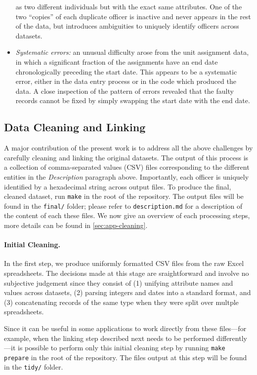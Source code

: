\begin{itemize}
		as two different individuals but with the exact same attributes. One of
		the two “copies” of each duplicate officer is inactive and never
		appears in the rest of the data, but introduces ambiguities to uniquely
		identify officers across datasets.
	\item \emph{Systematic errors:} an unusual difficulty arose from the unit
		assignment data, in which a significant fraction of the assignments
		have an end date chronologically preceding the start date. This appears
		to be a systematic error, either in the data entry process or in the
		code which produced the data. A close inspection of the pattern of
		errors revealed that the faulty records cannot be fixed by simply
		swapping the start date with the end date.
\end{itemize}


\subsection{Data Cleaning and Linking}\label{sec:cleaning}

A major contribution of the present work is to address all the above challenges
by carefully cleaning and linking the original datasets. The output of this
process is a collection of comma-separated values (CSV) files corresponding to
the different entities in the \emph{Description} paragraph above.  Importantly,
each officer is uniquely identified by a hexadecimal string across output
files. To produce the final, cleaned dataset, run \texttt{make} in the root of
the repository. The output files will be found in the \texttt{final/} folder;
please refer to \texttt{description.md} for a description of the content of
each these files. We now give an overview of each processing steps, more
details can be found in \cref{sec:app-cleaning}.

\paragraph{Initial Cleaning.} In the first step, we produce uniformly formatted
CSV files from the raw Excel spreadsheets. The decisions made at this stage are
sraightforward and involve no subjective judgement since they consist of (1)
unifying attribute names and values across datasets, (2) parsing integers and
dates into a standard format, and (3) concatenating records of the same type
when they were split over multple spreadsheets.

Since it can be useful in some applications to work directly from these
files—for example, when the linking step described next needs to be performed
differently—it is possible to perform only this initial cleaning step by
running \texttt{make prepare} in the root of the repository. The files output
at this step will be found in the \texttt{tidy/} folder.


